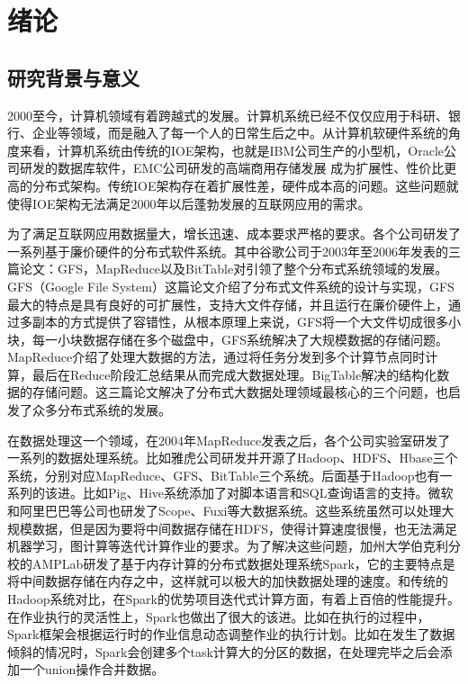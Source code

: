 \chapter{绪论}\label{chap:intro}

\section{研究背景与意义}
2000至今，计算机领域有着跨越式的发展。计算机系统已经不仅仅应用于科研、银行、企业等领域，而是融入了每一个人的日常生后之中。从计算机软硬件系统的角度来看，计算机系统由传统的IOE架构，也就是IBM公司生产的小型机，Oracle公司研发的数据库软件，EMC公司研发的高端商用存储发展 成为扩展性、性价比更高的分布式架构。传统IOE架构存在着扩展性差，硬件成本高的问题。这些问题就使得IOE架构无法满足2000年以后蓬勃发展的互联网应用的需求。

为了满足互联网应用数据量大，增长迅速、成本要求严格的要求。各个公司研发了一系列基于廉价硬件的分布式软件系统。其中谷歌公司于2003年至2006年发表的三篇论文：GFS，MapReduce以及BitTable对引领了整个分布式系统领域的发展。GFS（Google File System）这篇论文介绍了分布式文件系统的设计与实现，GFS最大的特点是具有良好的可扩展性，支持大文件存储，并且运行在廉价硬件上，通过多副本的方式提供了容错性，从根本原理上来说，GFS将一个大文件切成很多小块，每一小块数据存储在多个磁盘中，GFS系统解决了大规模数据的存储问题。MapReduce介绍了处理大数据的方法，通过将任务分发到多个计算节点同时计算，最后在Reduce阶段汇总结果从而完成大数据处理。BigTable解决的结构化数据的存储问题。这三篇论文解决了分布式大数据处理领域最核心的三个问题，也启发了众多分布式系统的发展。

在数据处理这一个领域，在2004年MapReduce发表之后，各个公司实验室研发了一系列的数据处理系统。比如雅虎公司研发并开源了Hadoop、HDFS、Hbase三个系统，分别对应MapReduce、GFS、BitTable三个系统。后面基于Hadoop也有一系列的该进。比如Pig、Hive系统添加了对脚本语言和SQL查询语言的支持。微软和阿里巴巴等公司也研发了Scope、Fuxi等大数据系统。这些系统虽然可以处理大规模数据，但是因为要将中间数据存储在HDFS，使得计算速度很慢，也无法满足机器学习，图计算等迭代计算作业的要求。为了解决这些问题，加州大学伯克利分校的AMPLab研发了基于内存计算的分布式数据处理系统Spark，它的主要特点是将中间数据存储在内存之中，这样就可以极大的加快数据处理的速度。和传统的Hadoop系统对比，在Spark的优势项目迭代式计算方面，有着上百倍的性能提升。在作业执行的灵活性上，Spark也做出了很大的该进。比如在执行的过程中，Spark框架会根据运行时的作业信息动态调整作业的执行计划。比如在发生了数据倾斜的情况时，Spark会创建多个task计算大的分区的数据，在处理完毕之后会添加一个union操作合并数据。

